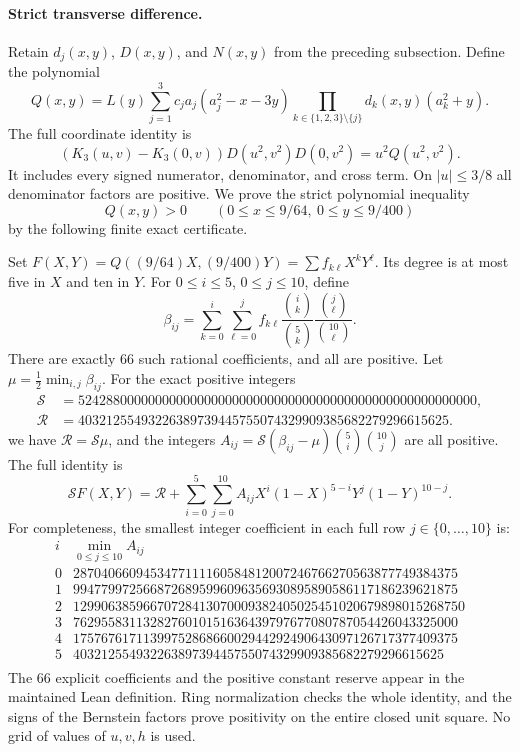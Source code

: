 \paragraph{Strict transverse difference.}
Retain \(d_j(x,y)\), \(D(x,y)\), and \(N(x,y)\) from the preceding
subsection.  Define the polynomial
\[
 Q(x,y)=L(y)\sum_{j=1}^3c_ja_j(a_j^2-x-3y)
       \prod_{k\in\{1,2,3\}\setminus\{j\}}d_k(x,y)(a_k^2+y).
\]
The full coordinate identity is
\begin{equation}
 (K_3(u,v)-K_3(0,v))D(u^2,v^2)D(0,v^2)
   =u^2Q(u^2,v^2).
 \label{eq:exact-window-transverse}
\end{equation}
It includes every signed numerator, denominator, and cross term.
On \(|u|\le3/8\) all denominator factors are positive.  We prove the
strict polynomial inequality
\[
 Q(x,y)>0\qquad(0\le x\le9/64,\ 0\le y\le9/400)
\]
by the following finite exact certificate.

Set \(F(X,Y)=Q((9/64)X,(9/400)Y)=\sum f_{k\ell}X^kY^\ell\).
Its degree is at most five in \(X\) and ten in \(Y\).  For
\(0\le i\le5\), \(0\le j\le10\), define
\[
 \beta_{ij}=\sum_{k=0}^i\sum_{\ell=0}^j f_{k\ell}
  \frac{\binom{i}{k}}{\binom{5}{k}}
  \frac{\binom{j}{\ell}}{\binom{10}{\ell}}.
\]
There are exactly 66 such rational coefficients, and all are positive.
Let \(\mu=\tfrac12\min_{i,j}\beta_{ij}\).  For the exact positive
integers
\[
 \begin{aligned}
 \mathcal S&=524288000000000000000000000000000000000000000000000000000,\\
 \mathcal R&=40321255493226389739445755074329909385682279296615625.
 \end{aligned}
\]
we have \(\mathcal R=\mathcal S\mu\), and the integers
\(A_{ij}=\mathcal S(\beta_{ij}-\mu)\binom{5}{i}\binom{10}{j}\)
are all positive.  The full identity is
\begin{equation}
 \mathcal S F(X,Y)=\mathcal R+
 \sum_{i=0}^{5}\sum_{j=0}^{10}A_{ij}
 X^i(1-X)^{5-i}Y^j(1-Y)^{10-j}.
 \label{eq:exact-window-transverse-certificate}
\end{equation}
For completeness, the smallest integer coefficient in each full row
\(j\in\{0,\ldots,10\}\) is:
\[
 \begin{array}{r|r}
 i & \min_{0\le j\le10}A_{ij}\\\hline
0 & 2870406609453477111160584812007246766270563877749384375 \\
1 & 9947799725668726895996096356930895890586117186239621875 \\
2 & 12990638596670728413070009382405025451020679898015268750 \\
3 & 7629558311328276010151636439797677080787054426043325000 \\
4 & 1757676171139975286866002944292490643097126717377409375 \\
5 & 40321255493226389739445755074329909385682279296615625 \\
 \end{array}
\]
The 66 explicit coefficients and the positive constant reserve appear in
the maintained Lean definition.  Ring normalization checks the whole
identity, and the signs of the Bernstein factors prove positivity on the
entire closed unit square.  No grid of values of \(u,v,h\) is used.


